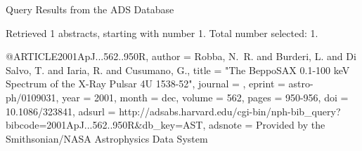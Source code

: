 Query Results from the ADS Database


Retrieved 1 abstracts, starting with number 1.  Total number selected: 1.

@ARTICLE{2001ApJ...562..950R,
   author = {{Robba}, N.~R. and {Burderi}, L. and {Di Salvo}, T. and {Iaria}, R. and 
	{Cusumano}, G.},
    title = "{The BeppoSAX 0.1-100 keV Spectrum of the X-Ray Pulsar 4U 1538-52}",
  journal = {\apj},
   eprint = {astro-ph/0109031},
     year = 2001,
    month = dec,
   volume = 562,
    pages = {950-956},
      doi = {10.1086/323841},
   adsurl = {http://adsabs.harvard.edu/cgi-bin/nph-bib_query?bibcode=2001ApJ...562..950R&db_key=AST},
  adsnote = {Provided by the Smithsonian/NASA Astrophysics Data System}
}


